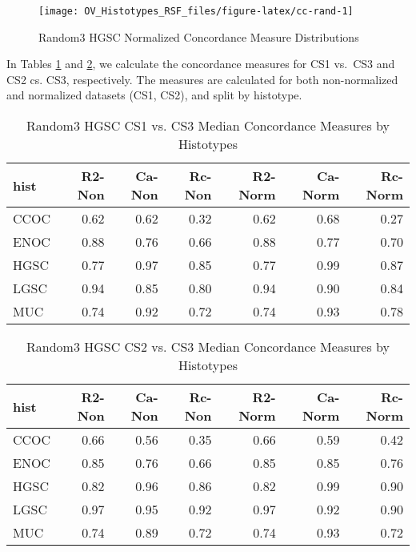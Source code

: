 \documentclass[
]{report}
\begin{document}
\begin{figure}[H]

{\centering \texttt{[image: OV\_Histotypes\_RSF\_files/figure-latex/cc-rand-1]} 

}

\caption{Random3 HGSC Normalized Concordance Measure Distributions}\label{fig:cc-rand}
\end{figure}

In Tables \ref{tab:rand3-hgsc-cs1-vs-cs3} and \ref{tab:rand3-hgsc-cs2-vs-cs3}, we calculate the concordance measures for CS1 vs.~CS3 and CS2 cs. CS3, respectively. The measures are calculated for both non-normalized and normalized datasets (CS1, CS2), and split by histotype.

\begin{table}

\caption{\label{tab:rand3-hgsc-cs1-vs-cs3}Random3 HGSC CS1 vs. CS3 Median Concordance Measures by Histotypes}
\centering
\begin{tabular}[t]{l|r|r|r|r|r|r}
\hline
hist & R2-Non & Ca-Non & Rc-Non & R2-Norm & Ca-Norm & Rc-Norm\\
\hline
CCOC & 0.62 & 0.62 & 0.32 & 0.62 & 0.68 & 0.27\\
\hline
ENOC & 0.88 & 0.76 & 0.66 & 0.88 & 0.77 & 0.70\\
\hline
HGSC & 0.77 & 0.97 & 0.85 & 0.77 & 0.99 & 0.87\\
\hline
LGSC & 0.94 & 0.85 & 0.80 & 0.94 & 0.90 & 0.84\\
\hline
MUC & 0.74 & 0.92 & 0.72 & 0.74 & 0.93 & 0.78\\
\hline
\end{tabular}
\end{table}

\begin{table}

\caption{\label{tab:rand3-hgsc-cs2-vs-cs3}Random3 HGSC CS2 vs. CS3 Median Concordance Measures by Histotypes}
\centering
\begin{tabular}[t]{l|r|r|r|r|r|r}
\hline
hist & R2-Non & Ca-Non & Rc-Non & R2-Norm & Ca-Norm & Rc-Norm\\
\hline
CCOC & 0.66 & 0.56 & 0.35 & 0.66 & 0.59 & 0.42\\
\hline
ENOC & 0.85 & 0.76 & 0.66 & 0.85 & 0.85 & 0.76\\
\hline
HGSC & 0.82 & 0.96 & 0.86 & 0.82 & 0.99 & 0.90\\
\hline
LGSC & 0.97 & 0.95 & 0.92 & 0.97 & 0.92 & 0.90\\
\hline
MUC & 0.74 & 0.89 & 0.72 & 0.74 & 0.93 & 0.72\\
\hline
\end{tabular}
\end{table}
\end{document}

